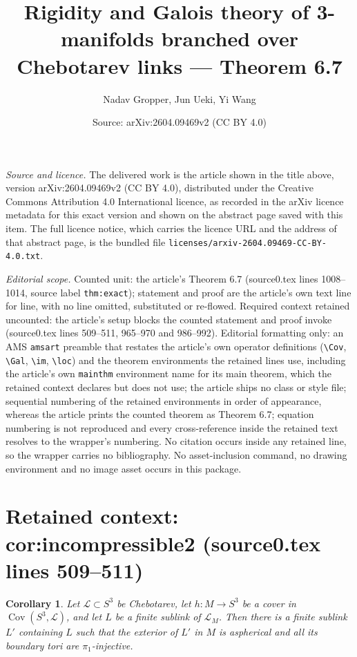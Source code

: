 \documentclass[10pt,a4paper]{amsart}
\title[Rigidity and Galois theory of 3-manifolds branched over Chebotarev links]{Rigidity and Galois theory of 3-manifolds branched over Chebotarev links — Theorem 6.7}
\author{Nadav Gropper, Jun Ueki, Yi Wang}
\date{Source: arXiv:2604.09469v2 (CC BY 4.0)}
\DeclareMathOperator{\Cov}{\mathrm{Cov}}
\theoremstyle{plain}
\newtheorem{corollary}[theorem]{Corollary}
\theoremstyle{definition}
\theoremstyle{remark}
\begin{document}
\maketitle

\noindent\emph{Source and licence.} The delivered work is the article shown in the title above, version arXiv:2604.09469v2 (CC BY 4.0), distributed under the Creative Commons Attribution 4.0 International licence, as recorded in the arXiv licence metadata for this exact version and shown on the abstract page saved with this item. The full licence notice, which carries the licence URL and the address of that abstract page, is the bundled file \texttt{licenses/arxiv-2604.09469-CC-BY-4.0.txt}.\par\smallskip

\noindent\textit{Editorial scope.} Counted unit: the article's Theorem 6.7 (source0.tex lines 1008--1014, source label \texttt{thm:exact}); statement and proof are the article's own text line for line, with no line omitted, substituted or re-flowed. Required context retained uncounted: the article's setup blocks the counted statement and proof invoke (source0.tex lines 509--511, 965--970 and 986--992). Editorial formatting only: an AMS \texttt{amsart} preamble that restates the article's own operator definitions (\texttt{\textbackslash Cov}, \texttt{\textbackslash Gal}, \texttt{\textbackslash im}, \texttt{\textbackslash loc}) and the theorem environments the retained lines use, including the article's own \texttt{mainthm} environment name for its main theorem, which the retained context declares but does not use; the article ships no class or style file; sequential numbering of the retained environments in order of appearance, whereas the article prints the counted theorem as Theorem 6.7; equation numbering is not reproduced and every cross-reference inside the retained text resolves to the wrapper's numbering. No citation occurs inside any retained line, so the wrapper carries no bibliography. No asset-inclusion command, no drawing environment and no image asset occurs in this package.


\section*{Retained context: cor:incompressible2 (source0.tex lines 509--511)}

\begin{corollary}\label{cor:incompressible2}
Let $\mathcal{L} \subset S^3$ be Chebotarev, let $h: M \to S^3$ be a cover in $\Cov(S^3, \mathcal L)$, and let $L$ be a finite sublink of $\mathcal L_M$. Then there is a finite sublink $L'$ containing $L$ such that the exterior of $L'$ in $M$ is aspherical and all its boundary tori are $\pi_1$-injective.
\end{corollary}
\end{document}
